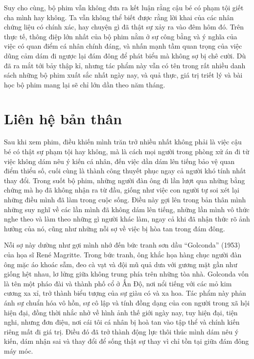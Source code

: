 \documentclass[12pt,a4paper]{article}
\begin{document}
Suy cho cùng, bộ phim vẫn không đưa ra kết luận rằng cậu bé có phạm tội giết cha mình hay không. Ta vẫn không thể biết được rằng lời khai của các nhân chứng liệu có chính xác,
hay chuyện gì đã thật sự xảy ra vào đêm hôm đó. Trên thực tế, thông điệp lớn nhất của bộ phim nằm ở sự công bằng và ý nghĩa của việc có quan điểm cá nhân chính đáng, và nhấn mạnh
tầm quan trọng của việc dũng cảm dám đi ngược lại đám đông để phát biểu mà không sợ bị chê cười.
Dù đã ra mắt tới bảy thập kỉ, nhưng tác phẩm này vẫn có tên trong rất nhiều danh sách những bộ phim xuất sắc nhất ngày nay,
và quả thực, giá trị triết lý và bài học bộ phim mang lại sẽ chỉ lớn dần theo năm tháng.


\section{Liên hệ bản thân}

Sau khi xem phim, điều khiến mình trăn trở nhiều nhất không phải là việc cậu bé có thật sự phạm tội hay không, mà là cách mọi người trong phòng xử án đi từ việc
không dám nêu ý kiến cá nhân, đến việc dần dám lên tiếng bảo vệ quan điểm thiểu số, cuối cùng là thành công thuyết phục ngay cả người khó tính nhất thay đổi.
Trong suốt bộ phim, những người đàn ông đi lần lượt qua những bằng chứng mà họ đã không nhận ra từ đầu, giống như việc con người tự soi xét lại những điều mình đã làm trong cuộc sống.
Điều này gợi lên trong bản thân mình những suy nghĩ về các lần mình đã không dám lên tiếng, những lần mình vô thức nghe theo và làm theo những gì người khác làm,
ngay cả khi đã nhận thức rõ ảnh hưởng của nó, cũng như những nỗi sợ về việc bị hòa tan trong đám đông.


Nỗi sợ này dường như gợi mình nhớ đến bức tranh sơn dầu ``Golconda'' (1953) của họa sĩ René Magritte. Trong bức tranh, ông khắc họa hàng chục người đàn ông mặc áo khoác sẫm,
đeo cà vạt và đội mũ quả dưa với gương mặt gần như giống hệt nhau, lơ lửng giữa không trung phía trên những tòa nhà. Golconda vốn là tên một pháo đài và thành phố cổ ở Ấn Độ, nơi nổi tiếng với các mỏ kim cương xa xỉ, trở thành biểu tượng của sự giàu có và xa hoa.
Tác phẩm này phản ánh sự chuẩn hóa vô hồn, sự cô lập và tính đồng dạng của con người trong xã hội hiện đại, đồng thời nhắc nhở về hình ảnh thế giới ngày nay, tuy hiện đại, tiện nghi, nhưng đơn điệu, nơi cái tôi cá nhân bị hoà tan vào tập thể và chính kiến riêng mất đi giá trị.
Điều đó đã trở thành động lực thôi thúc mình dám nêu ý kiến, dám nhận sai và thay đổi để sống thật sự thay vì chỉ tồn tại giữa đám đông máy móc.
\end{document}
